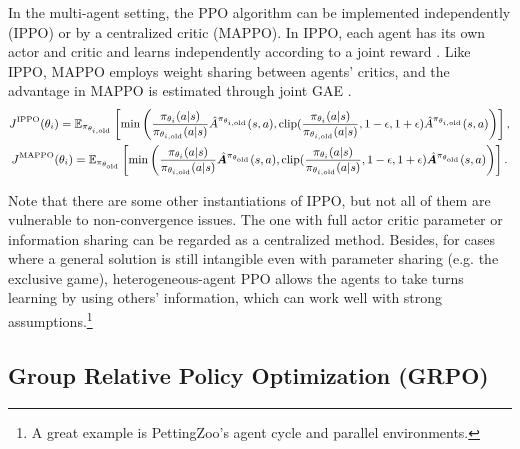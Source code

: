 \documentclass{article} %
\begin{document}
In the multi-agent setting, the PPO algorithm can be implemented independently (IPPO) or by a centralized critic (MAPPO). In IPPO, each agent has its own actor and critic and learns independently according to a joint reward \cite{ippo}. Like IPPO, MAPPO employs weight sharing between agents' critics, and the advantage in MAPPO is estimated through joint GAE \cite{mappo}.
\begin{equation} \label{equ:MAPPO}
\small
\begin{gathered}
	J^\text{IPPO}(\theta_i) = \mathbb{E}_{\pi_{\theta_{i, \text{old}}}} \left[ \min \left( \frac{\pi_{\theta_i}(a|s)}{\pi_{\theta_{i, \text{old}}}(a|s)} \hat{A}^{\pi_{\theta_{i, \text{old}}}}(s, a), \text{clip}(\frac{\pi_{\theta_i}(a|s)}{\pi_{\theta_{i, \text{old}}}(a|s)}, 1 - \epsilon, 1 + \epsilon) \hat{A}^{\pi_{\theta_{i,\text{old}}}}(s, a) \right) \right],\\
    J^\text{MAPPO}(\theta_i) = \mathbb{E}_{\pi_{\theta_{\text{old}}}} \left[ \min \left( \frac{\pi_{\theta_i}(a|s)}{\pi_{\theta_{i, \text{old}}}(a|s)} \hat{\boldsymbol{A}}^{\pi_{\theta_{\text{old}}}}(s, a), \text{clip}(\frac{\pi_{\theta_i}(a|s)}{\pi_{\theta_{i, \text{old}}}(a|s)}, 1 - \epsilon, 1 + \epsilon) \hat{\boldsymbol{A}}^{\pi_{\theta_{\text{old}}}}(s, a) \right) \right].
\end{gathered}
\end{equation}

Note that there are some other instantiations of IPPO, but not all of them are vulnerable to non-convergence issues. The one with full actor critic parameter or information sharing can be regarded as a centralized method. Besides, for cases where a general solution is still intangible even with parameter sharing (e.g. the exclusive game), heterogeneous-agent PPO allows the agents to take turns learning by using others' information, which can work well with strong assumptions.\footnote{A great example is PettingZoo's agent cycle and parallel environments.} 

\subsection{Group Relative Policy Optimization (GRPO)}
\end{document}
